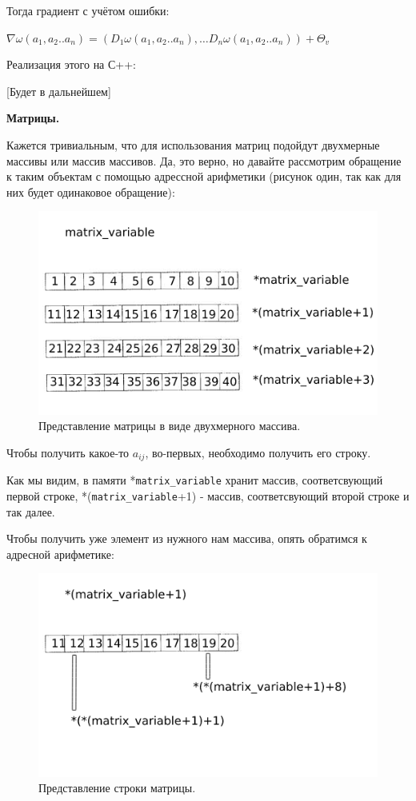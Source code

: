 \documentclass[12pt]{extarticle}
\begin{document}
	Тогда градиент с учётом ошибки:
	
		\centerline{$\nabla \omega(a_1, a_2 .. a_n) = (D_1\omega(a_1, a_2 .. a_n), \dots D_n\omega(a_1, a_2 .. a_n)) + \Theta_v$}
	
	Реализация этого на С++:
	
		[Будет в дальнейшем]
		
	\centerline{\textbf{Матрицы.}}
		
		Кажется тривиальным, что для использования матриц подойдут двухмерные массивы или массив массивов. Да, это верно, но давайте рассмотрим обращение к таким объектам с помощью адрессной арифметики (рисунок один, так как для них будет одинаковое обращение):
		
	\begin{figure}[h]
			\centering
			\includegraphics[width=0.8\linewidth]{matrix_1.png}
			\caption{Представление матрицы в виде двухмерного массива.}
			\label{fig:mpr}
	\end{figure}
	
	\newpage
	
	Чтобы получить какое-то $a_{ij}$, во-первых, необходимо получить его строку.
	
	Как мы видим, в памяти *\texttt{matrix\_variable} хранит массив, соответсвующий первой строке, *(\texttt{matrix\_variable}+1) - массив, соответсвующий второй строке и так далее.
	
	Чтобы получить уже элемент из нужного нам массива, опять обратимся к адресной арифметике:
	
	
	
	\begin{figure}[h]
			\centering
			\includegraphics[width=0.8\linewidth]{matrix_2.png}
			\caption{Представление строки матрицы.}
			\label{fig:mpr}
	\end{figure}
	
\end{document}
